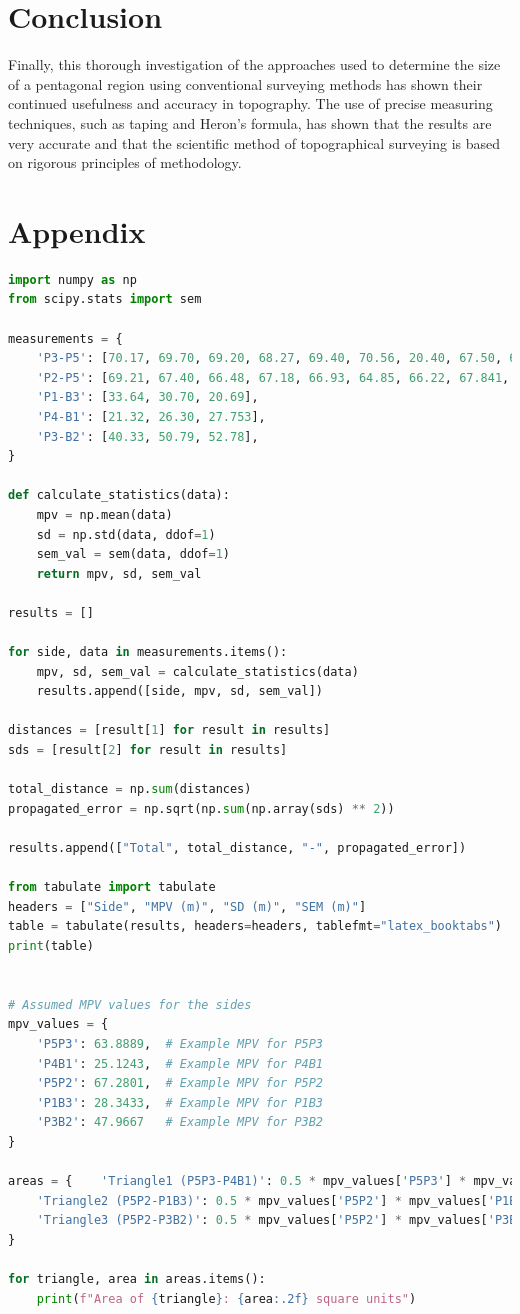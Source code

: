 \documentclass[12pt]{report}
\begin{document}
\section*{Conclusion}

Finally, this thorough investigation of the approaches used to determine the size of a pentagonal region using conventional surveying methods has shown their continued usefulness and accuracy in topography. The use of precise measuring techniques, such as taping and Heron's formula, has shown that the results are very accurate and that the scientific method of topographical surveying is based on rigorous principles of methodology.



\section*{Appendix}

\begin{lstlisting}[language=Python]
import numpy as np
from scipy.stats import sem

measurements = {
    'P3-P5': [70.17, 69.70, 69.20, 68.27, 69.40, 70.56, 20.40, 67.50, 69.80],
    'P2-P5': [69.21, 67.40, 66.48, 67.18, 66.93, 64.85, 66.22, 67.841, 69.41],
    'P1-B3': [33.64, 30.70, 20.69],
    'P4-B1': [21.32, 26.30, 27.753],
    'P3-B2': [40.33, 50.79, 52.78],
}

def calculate_statistics(data):
    mpv = np.mean(data)
    sd = np.std(data, ddof=1)
    sem_val = sem(data, ddof=1)
    return mpv, sd, sem_val

results = []

for side, data in measurements.items():
    mpv, sd, sem_val = calculate_statistics(data)
    results.append([side, mpv, sd, sem_val])

distances = [result[1] for result in results]
sds = [result[2] for result in results]

total_distance = np.sum(distances)
propagated_error = np.sqrt(np.sum(np.array(sds) ** 2))

results.append(["Total", total_distance, "-", propagated_error])

from tabulate import tabulate
headers = ["Side", "MPV (m)", "SD (m)", "SEM (m)"]
table = tabulate(results, headers=headers, tablefmt="latex_booktabs")
print(table)


# Assumed MPV values for the sides
mpv_values = {
    'P5P3': 63.8889,  # Example MPV for P5P3
    'P4B1': 25.1243,  # Example MPV for P4B1
    'P5P2': 67.2801,  # Example MPV for P5P2
    'P1B3': 28.3433,  # Example MPV for P1B3
    'P3B2': 47.9667   # Example MPV for P3B2
}

areas = {    'Triangle1 (P5P3-P4B1)': 0.5 * mpv_values['P5P3'] * mpv_values['P4B1'],
    'Triangle2 (P5P2-P1B3)': 0.5 * mpv_values['P5P2'] * mpv_values['P1B3'],
    'Triangle3 (P5P2-P3B2)': 0.5 * mpv_values['P5P2'] * mpv_values['P3B2']
}

for triangle, area in areas.items():
    print(f"Area of {triangle}: {area:.2f} square units")

\end{lstlisting}
\end{document}
